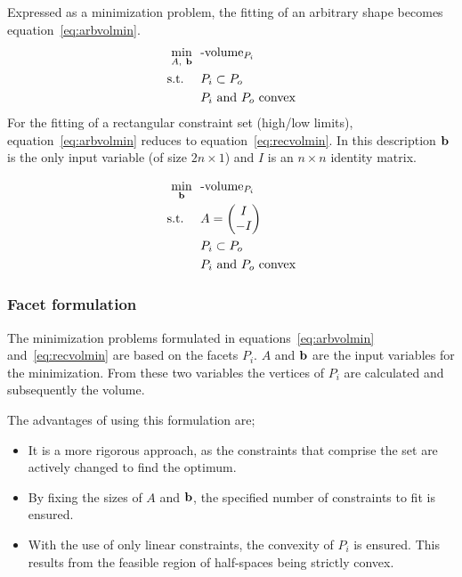 Expressed as a minimization problem, the fitting of an arbitrary shape  becomes equation~\ref{eq:arbvolmin}.
\begin{align}
  \label{eq:arbvolmin}
    \min_{A,~{\bf {b}}}~~&\text{-volume}_{P_i}\\
    \text{s.t.}~~~~ &P_i \subset P_o \notag \\
                    &P_i \text{~and~} P_o \text{~convex} \notag
\end{align}
For the fitting of a rectangular constraint set (high/low limits), equation~\ref{eq:arbvolmin} reduces to equation~\ref{eq:recvolmin}.
In this description ${\bf {b}}$ is the only input variable (of size $2n \times 1$) and $I$ is an $n\times n$ identity matrix.

\begin{align}
  \label{eq:recvolmin}
    \min_{{\bf {b}}}~~&\text{-volume}_{P_i}\\
    \text{s.t.}~~~~ &A = \begin{pmatrix} I \\ -I \end{pmatrix} \notag \\
                    &P_i \subset P_o \notag \\
                    &P_i \text{~and~} P_o \text{~convex} \notag
\end{align}

\subsubsection{Facet formulation}
The minimization problems formulated in equations~\ref{eq:arbvolmin} and~\ref{eq:recvolmin} are based on the facets $P_i$.
$A$ and ${\bf {b}}$ are the input variables for the minimization.
From these two variables the vertices of $P_i$ are calculated and subsequently the volume.

The advantages of using this formulation are;
\begin{itemize}
\item It is a more rigorous approach, as the constraints that comprise the set are actively changed to find the optimum.
\item By fixing the sizes of $A$ and ${\bf {b}}$, the specified number of constraints to fit is ensured.
\item With the use of only linear constraints, the convexity of $P_i$ is ensured.
This results from the feasible region of half-spaces being strictly convex.
\end{itemize}

